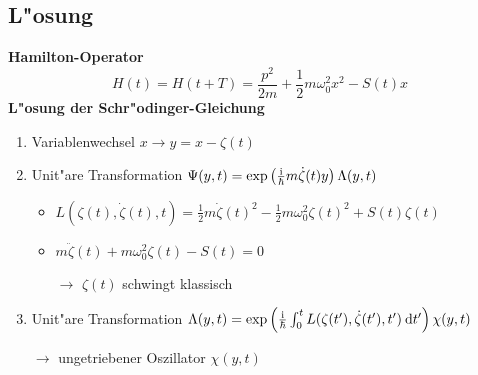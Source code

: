 \subsection{L"osung}
\begin{frame}
  \textbf{Hamilton-Operator}
  \begin{equation} %
    H(t) = H(t+T) = \frac{p^2}{2m} + \frac{1}{2}m\omega_0^2x^2-S(t)x
  \end{equation}
  \textbf{L"osung der Schr"odinger-Gleichung}
  \begin{enumerate}
    \item Variablenwechsel $x \rightarrow y=x-\zeta(t)$ %
    \item Unit"are Transformation $\Psi(y,t) = \exp\left(\frac{\text i}{\hbar}m\dot \zeta(t) y\right)\Lambda(y,t)$
    \begin{itemize}
      \item $L(\zeta(t),\dot \zeta(t), t) = \frac{1}{2}m\dot \zeta(t)^2 - \frac{1}{2}m\omega_0^2\zeta(t)^2 + S(t)\zeta(t)$
      \item   $m\ddot \zeta(t) + m\omega_0^2\zeta(t) - S(t) = 0$

      $\rightarrow$ $\zeta(t)$ schwingt klassisch
    \end{itemize}
    \item Unit"are Transformation  $\Lambda(y,t) = \exp\left(\frac{\text i}{\hbar}\int_0^tL(\zeta(t'),\dot \zeta(t'), t') \: \text d t'\right)\chi(y,t)$

    $\rightarrow$ ungetriebener Oszillator $\chi(y,t)$
  \end{enumerate}
\end{frame}


